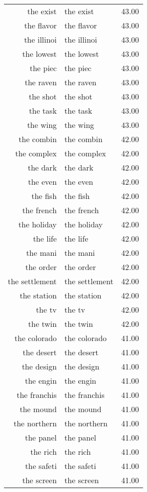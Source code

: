 \begin{table}[ht]
\begin{tabular}{rlr}
  the exist & the exist & 43.00 \\ 
  the flavor & the flavor & 43.00 \\ 
  the illinoi & the illinoi & 43.00 \\ 
  the lowest & the lowest & 43.00 \\ 
  the piec & the piec & 43.00 \\ 
  the raven & the raven & 43.00 \\ 
  the shot & the shot & 43.00 \\ 
  the task & the task & 43.00 \\ 
  the wing & the wing & 43.00 \\ 
  the combin & the combin & 42.00 \\ 
  the complex & the complex & 42.00 \\ 
  the dark & the dark & 42.00 \\ 
  the even & the even & 42.00 \\ 
  the fish & the fish & 42.00 \\ 
  the french & the french & 42.00 \\ 
  the holiday & the holiday & 42.00 \\ 
  the life & the life & 42.00 \\ 
  the mani & the mani & 42.00 \\ 
  the order & the order & 42.00 \\ 
  the settlement & the settlement & 42.00 \\ 
  the station & the station & 42.00 \\ 
  the tv & the tv & 42.00 \\ 
  the twin & the twin & 42.00 \\ 
  the colorado & the colorado & 41.00 \\ 
  the desert & the desert & 41.00 \\ 
  the design & the design & 41.00 \\ 
  the engin & the engin & 41.00 \\ 
  the franchis & the franchis & 41.00 \\ 
  the mound & the mound & 41.00 \\ 
  the northern & the northern & 41.00 \\ 
  the panel & the panel & 41.00 \\ 
  the rich & the rich & 41.00 \\ 
  the safeti & the safeti & 41.00 \\ 
  the screen & the screen & 41.00 \\ 

\end{tabular}
\end{table}
